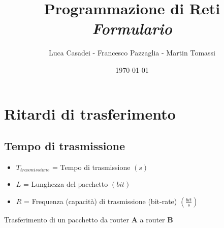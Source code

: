 \documentclass[a4paper]{report}
\title{\textbf{Programmazione di Reti} \\ \textit{Formulario}}
\author{Luca Casadei - Francesco Pazzaglia - Martin Tomassi}
\date{\today}
\begin{document}
	\maketitle
	\tableofcontents
	\chapter{Ritardi di trasferimento}
	\section{Tempo di trasmissione}
	\begin{itemize}
		\item $T_{\textit{trasmissione}}$ = Tempo di trasmissione $(s)$
		\item $L$ = Lunghezza del pacchetto $(bit)$
		\item $R$ = Frequenza (capacità) di trasmissione (bit-rate) $(\frac{bit}{s})$
	\end{itemize}
	Trasferimento di un pacchetto da router \textbf{A} a router \textbf{B}\\\\
\end{document}
